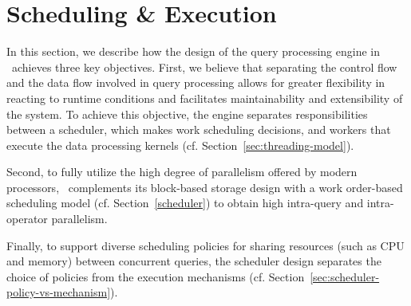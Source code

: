
\section{Scheduling \& Execution} \label{query-exec}
In this section, we describe how the design of the query processing engine in \Quickstep\ achieves three key objectives. First, we believe that separating the control flow and the data flow involved in query processing allows for greater flexibility in reacting to runtime conditions and facilitates maintainability and extensibility of the system. To achieve this objective, the engine separates responsibilities between a scheduler, which makes work scheduling decisions, and workers that execute the data processing kernels (cf. Section~\ref{sec:threading-model}).

Second, to fully utilize the high degree of parallelism offered by modern processors, \Quickstep\ complements its block-based storage design with a work order-based scheduling model (cf. Section~\ref{scheduler}) to obtain high intra-query and intra-operator parallelism.

Finally, to support diverse scheduling policies for sharing resources (such as CPU and memory) between concurrent  queries, the scheduler design separates the choice of policies from the execution mechanisms (cf. Section~\ref{sec:scheduler-policy-vs-mechanism}).


